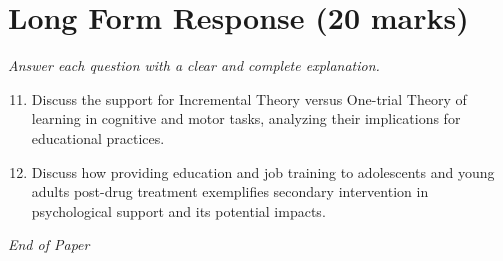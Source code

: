 \documentclass[12pt]{article}
\begin{document}
\section*{Long Form Response (20 marks)}
\textit{Answer each question with a clear and complete explanation.}
\begin{enumerate}[label=\arabic*.]
\setcounter{enumi}{10}
\item Discuss the support for Incremental Theory versus One-trial Theory of learning in cognitive and motor tasks, analyzing their implications for educational practices.
\item Discuss how providing education and job training to adolescents and young adults post-drug treatment exemplifies secondary intervention in psychological support and its potential impacts.
\end{enumerate}

\vfill
\noindent\textit{End of Paper}
\end{document}
